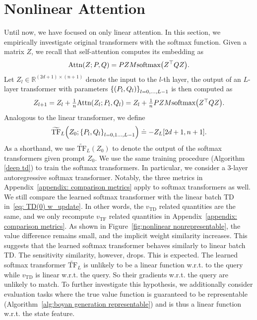 \documentclass{article}
\newcommand{\R}{\mathbb{R}}
\newcommand{\nattn}{\text{Attn}}
\newcommand{\tf}{\text{TF}}
\newcommand{\ntf}{\widetilde{\tf}}
\newcommand{\softmax}[1]{\text{softmax}\qty(#1)}
\newcommand{\td}{\text{TD}}
\begin{document}
\section{Nonlinear Attention}\label{appendix: nonlinear}
Until now, we have focused on only linear attention.
In this section,
we empirically investigate original transformers with the softmax function.
Given a matrix $Z$,
we recall that self-attention computes its embedding as
\begin{align}
    \nattn(Z; P, Q) = PZM\softmax{Z^\top Q Z}.
\end{align}
Let $Z_l \in \R^{(2d+1)\times(n+1)}$ denote the input to the $l$-th layer, the output of an $L$-layer transformer with parameters $\qty{(P_l, Q_l)}_{l=0,\dots,L-1}$ is then computed as
\begin{align}
    \textstyle Z_{l+1} = Z_l + \frac{1}{n}\nattn(Z_l; P_l, Q_l)
    = Z_l + \frac{1}{n} PZM\softmax{Z^\top Q Z}.
\end{align}
Analogous to the linear transformer, we define
\begin{align}
\ntf_L \qty(Z_0; \qty{P_l, Q_l}_{l=0,1\dots,L-1}) \doteq -Z_L[2d + 1, n + 1].
\end{align}
As a shorthand, we use $\ntf_L(Z_0)$ to denote the output of the softmax transformers given prompt $Z_0$.
We use the same training procedure (Algorithm \ref{deep td}) to train the softmax transformers.
In particular,
we consider a 3-layer autoregressive softmax transformer.
Notably, the three metrics in Appendix~\ref{appendix: comparison metrics} apply to softmax transformers as well.
We still compare the learned softmax transformer with the linear batch TD in~\eqref{eq: TD(0) w_update}.
In other words, the $v_\td$ related quantities are the same, and we only recompute $v_\tf$ related quantities in Appendix~\ref{appendix: comparison metrics}.
As shown in Figure~\ref{fig:nonlinear nonrepresentable},
the value difference remains small, and the implicit weight similarity increases.
This suggests that the learned softmax transformer behaves similarly to linear batch TD.
The sensitivity similarity, however, drops.
This is expected.
The learned softmax transformer $\ntf_L$ is unlikely to be a linear function w.r.t. to the query while $v_\td$ is linear w.r.t. the query.
So their gradients w.r.t. the query are unlikely to match.
To further investigate this hypothesis,
we additionally consider evaluation tasks where the true value function is guaranteed to be representable (Algorithm~\ref{alg:boyan generation representable}) and is thus a linear function w.r.t. the state feature.
\end{document}
